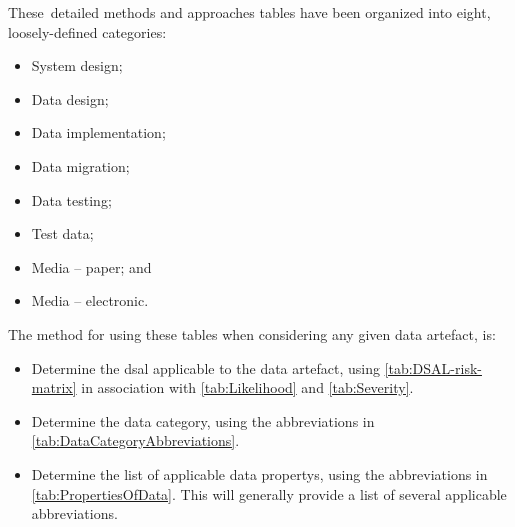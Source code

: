 \cbstart These\cbend\ detailed methods and approaches tables have been organized into eight, loosely-defined categories:
\begin{itemize}
  \item System design;
  \item Data design;
  \item Data implementation;
  \item Data migration;
  \item Data testing;
  \item Test data;
  \item Media -- paper; and 
  \item Media -- electronic.
\end{itemize}

The method for using these tables when considering any given \gls{data artefact}, is:
\begin{itemize}
    \item Determine the \gls{dsal} applicable to the \cbstart\gls{data artefact}\cbend, using \autoref{tab:DSAL-risk-matrix} in association with \autoref{tab:Likelihood} and \autoref{tab:Severity}.
    \item Determine the data category, using the abbreviations in \autoref{tab:DataCategoryAbbreviations}.
    \item Determine the list of applicable \glspl{data property}, using the abbreviations in \autoref{tab:PropertiesOfData}. This will generally provide a list of several applicable abbreviations.
\end{itemize}

